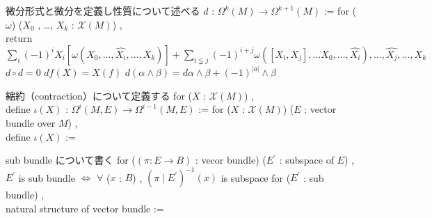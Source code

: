 \begin{Proof}
\itemprof
  \WIP
\itemprof
  \WIP
\end{Proof}

\begin{Definition}
\itemnote
  微分形式と微分を定義し性質について述べる
\itemdefi
  \(d\) : \(\Omega^{k}(M) \to \Omega^{k + 1}(M)\) :=
  for (\(\omega\)) (\(X_0\) , \ldots , \(X_k\) : \(\mathcal{X}(M)\)) ,\\
  return \(\sum_i (-1)^i X_i[\omega(X_0 , \ldots , \hat{X_i} , \ldots , X_k)] + \sum_{i \lneqq j} (-1)^{i + j} \omega([X_i , X_j] , \ldots X_0 , \ldots , \hat{X_i}) , \ldots , \hat{X_j} , \ldots , X_k\)
\itemprop
  \(d \circ d = 0\)
\itemprop
  \(df (X) = X(f)\)
\itemprop
  \(d (\alpha \wedge \beta) = d \alpha \wedge \beta + (-1)^{|a|} \wedge \beta\)
\end{Definition}

\begin{Definition}
\itemnote
  縮約（contraction）について定義する
\itemdefi
  for (\(X\) : \(\mathcal{X}(M)\)) ,\\
  define \(\iota(X)\) : \(\Omega^i(M , E) \to \Omega^{i - 1}(M ,E)\) := 
\itemdefi
  for (\(X\) : \(\mathcal{X}(M)\)) (\(E\) : vector bundle over \(M\)) ,\\
  define \(\iota(X)\) := 
\end{Definition}

\begin{Definition}
\itemnote
  sub bundle について書く
\itemdefi
  for (\((\pi : E \to B)\) : vecor bundle) (\(E^{\prime}\) : subspace of \(E\)) ,\\
  \(E^{\prime}\) is sub bundle \(\iff\) \(\forall\) (\(x\) : \(B\)) , \((\pi \mid E^{\prime})^{-1}(x)\) is subspace
\itemdefi
  for (\(E^{\prime}\) : sub bundle) ,\\
  natural structure of vector bundle := 
\end{Definition}

